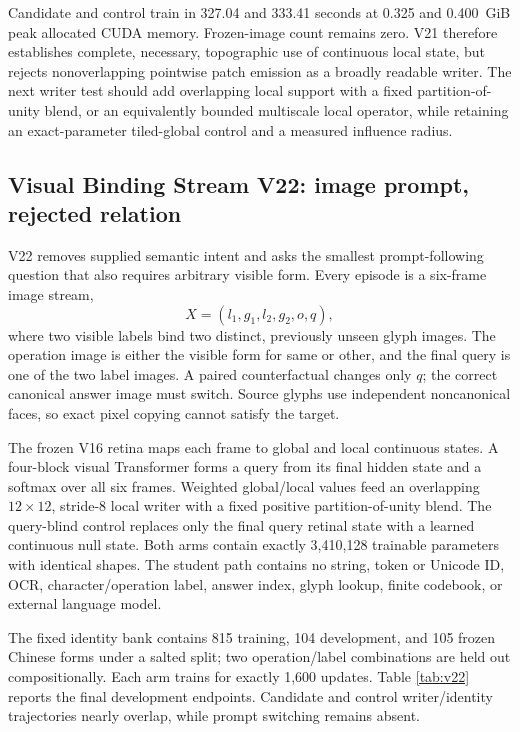 \documentclass[11pt]{article}
\begin{document}
Candidate and control train in 327.04 and 333.41 seconds at 0.325 and
0.400~GiB peak allocated CUDA memory. Frozen-image count remains zero. V21
therefore establishes complete, necessary, topographic use of continuous local
state, but rejects nonoverlapping pointwise patch emission as a broadly
readable writer. The next writer test should add overlapping local support with
a fixed partition-of-unity blend, or an equivalently bounded multiscale local
operator, while retaining an exact-parameter tiled-global control and a
measured influence radius.

\subsection{Visual Binding Stream V22: image prompt, rejected relation}

V22 removes supplied semantic intent and asks the smallest prompt-following
question that also requires arbitrary visible form. Every episode is a
six-frame image stream,
\[
X=(l_1,g_1,l_2,g_2,o,q),
\]
where two visible labels bind two distinct, previously unseen glyph images. The
operation image is either the visible form for same or other, and the final
query is one of the two label images. A paired counterfactual changes only $q$;
the correct canonical answer image must switch. Source glyphs use independent
noncanonical faces, so exact pixel copying cannot satisfy the target.

The frozen V16 retina maps each frame to global and local continuous states. A
four-block visual Transformer forms a query from its final hidden state and a
softmax over all six frames. Weighted global/local values feed an overlapping
$12\times12$, stride-8 local writer with a fixed positive
partition-of-unity blend. The query-blind control replaces only the final
query retinal state with a learned continuous null state. Both arms contain
exactly 3,410,128 trainable parameters with identical shapes. The student path
contains no string, token or Unicode ID, OCR, character/operation label, answer
index, glyph lookup, finite codebook, or external language model.

The fixed identity bank contains 815 training, 104 development, and 105 frozen
Chinese forms under a salted split; two operation/label combinations are held
out compositionally. Each arm trains for exactly 1,600 updates. Table
\ref{tab:v22} reports the final development endpoints. Candidate and control
writer/identity trajectories nearly overlap, while prompt switching remains
absent.
\end{document}
